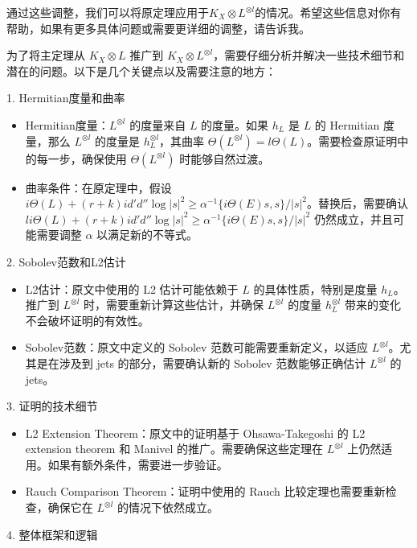 \documentclass[lang=cn,12pt,fontset=none,a4paper]{beautybook}
\begin{document}
通过这些调整，我们可以将原定理应用于$K_X\otimes L^{\otimes l}$的情况。希望这些信息对你有帮助，如果有更多具体问题或需要更详细的调整，请告诉我。


为了将主定理从 $K_X \otimes L$ 推广到 $K_X \otimes L^{\otimes l}$，需要仔细分析并解决一些技术细节和潜在的问题。以下是几个关键点以及需要注意的地方：

1. Hermitian度量和曲率
\begin{itemize}
   \item Hermitian度量：$L^{\otimes l}$ 的度量来自 $L$ 的度量。如果 $h_L$ 是 $L$ 的 Hermitian 度量，那么 $L^{\otimes l}$ 的度量是 $h_L^{\otimes l}$，其曲率 $\Theta(L^{\otimes l}) = l\Theta(L)$。需要检查原证明中的每一步，确保使用 $\Theta(L^{\otimes l})$ 时能够自然过渡。
   \item 曲率条件：在原定理中，假设 $i\Theta(L) + (r + k) id'd'' \log |s|^2 \geq \alpha^{-1} \{i\Theta(E)s, s\}/|s|^2$。替换后，需要确认 $li\Theta(L) + (r + k) id'd'' \log |s|^2 \geq \alpha^{-1} \{i\Theta(E)s, s\}/|s|^2$ 仍然成立，并且可能需要调整 $\alpha$ 以满足新的不等式。
\end{itemize}

2. Sobolev范数和L2估计

\begin{itemize}
   \item L2估计：原文中使用的 L2 估计可能依赖于 $L$ 的具体性质，特别是度量 $h_L$。推广到 $L^{\otimes l}$ 时，需要重新计算这些估计，并确保 $L^{\otimes l}$ 的度量 $h_L^{\otimes l}$ 带来的变化不会破坏证明的有效性。
         
   \item Sobolev范数：原文中定义的 Sobolev 范数可能需要重新定义，以适应 $L^{\otimes l}$。尤其是在涉及到 jets 的部分，需要确认新的 Sobolev 范数能够正确估计 $L^{\otimes l}$ 的 jets。
\end{itemize}


3. 证明的技术细节

\begin{itemize}
   \item L2 Extension Theorem：原文中的证明基于 Ohsawa-Takegoshi 的 L2 extension theorem 和 Manivel 的推广。需要确保这些定理在 $L^{\otimes l}$ 上仍然适用。如果有额外条件，需要进一步验证。
         
   \item Rauch Comparison Theorem：证明中使用的 Rauch 比较定理也需要重新检查，确保它在 $L^{\otimes l}$ 的情况下依然成立。
\end{itemize}


4. 整体框架和逻辑
\end{document}
